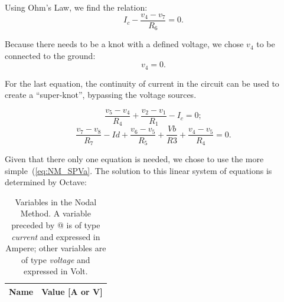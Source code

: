 Using Ohm’s Law, we find the relation:
\begin{equation}
  I_c - \frac{v_4-v_7}{R_6} = 0.
  \label{eq:NM_OhmIc}
\end{equation}

Because there needs to be a knot with a defined voltage, we chose $v_4$ to be connected to the ground:
\begin{equation}
  v_4 = 0.
  \label{eq:NM_v4=0}
\end{equation}

For the last equation, the continuity of current in the circuit can be used to create a “super-knot”, bypassing the voltage sources.

\begin{equation}
  \frac{v_5-v_4}{R_4} + \frac{v_2-v_1}{R_1} - I_c = 0;
  \label{eq:NM_SPVa}
\end{equation}
\begin{equation}
  \frac{v_7-v_8}{R_7} - Id + \frac{v_6-v_5}{R_5} + \frac{Vb}{R3} + \frac{v_4-v_5}{R_4} = 0.
  \label{eq:NM_SPVc}
\end{equation}

Given that there only one equation is needed, we chose to use the more simple~(\ref{eq:NM_SPVa}.
The solution to this linear system of equations is determined by Octave:

\begin{table}[h]
  \centering
  \begin{tabular}{|l|r|}
    \hline    
    {\bf Name} & {\bf Value [A or V]} \\ \hline
    
  \end{tabular}
  \caption{Variables in the Nodal Method. A variable preceded by @ is of type {\em current} and expressed in Ampere; other variables are of type {\em voltage} and expressed in Volt.}
  \label{tab:nos}
\end{table}

